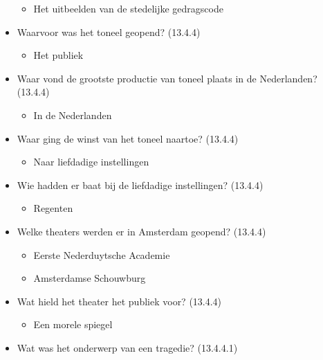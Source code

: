 \begin{itemize}
  \begin{itemize}
  \itemsep1pt\parskip0pt
  \item
    Het uitbeelden van de stedelijke gedragscode
  \end{itemize}
\item
  Waarvoor was het toneel geopend? (13.4.4)

  \begin{itemize}
  \itemsep1pt\parskip0pt
  \item
    Het publiek
  \end{itemize}
\item
  Waar vond de grootste productie van toneel plaats in de Nederlanden?
  (13.4.4)

  \begin{itemize}
  \itemsep1pt\parskip0pt
  \item
    In de Nederlanden
  \end{itemize}
\item
  Waar ging de winst van het toneel naartoe? (13.4.4)

  \begin{itemize}
  \itemsep1pt\parskip0pt
  \item
    Naar liefdadige instellingen
  \end{itemize}
\item
  Wie hadden er baat bij de liefdadige instellingen? (13.4.4)

  \begin{itemize}
  \itemsep1pt\parskip0pt
  \item
    Regenten
  \end{itemize}
\item
  Welke theaters werden er in Amsterdam geopend? (13.4.4)

  \begin{itemize}
  \itemsep1pt\parskip0pt
  \item
    Eerste Nederduytsche Academie
  \item
    Amsterdamse Schouwburg
  \end{itemize}
\item
  Wat hield het theater het publiek voor? (13.4.4)

  \begin{itemize}
  \itemsep1pt\parskip0pt
  \item
    Een morele spiegel
  \end{itemize}
\item
  Wat was het onderwerp van een tragedie? (13.4.4.1)


\end{itemize}
